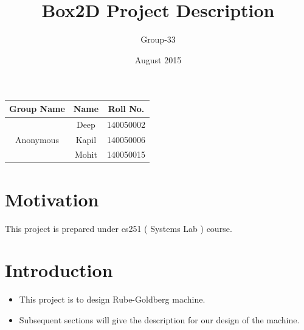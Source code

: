 \documentclass{article}
\title{Box2D Project Description}
\author{ Group-33 }
\date{August 2015}
\begin{document}
\maketitle

\begin{table}[h!]
\begin{center}

 \begin{tabular}{*{3}{c}}
\toprule
Group Name & Name & Roll No.\\
\midrule
\multirow{3}{*}{Anonymous} & Deep & 140050002 \\
  & Kapil & 140050006 \\
  & Mohit & 140050015 \\
\bottomrule
\end{tabular} 
 
\end{center}
\end{table}




\newpage

\section{Motivation}
This project is prepared under cs251 ( Systems Lab ) course.

\section{Introduction}
\begin{itemize}
  \item This project is to design Rube-Goldberg machine.
  \item Subsequent sections will give the description for our design of the machine.
\end{itemize}
\end{document}
